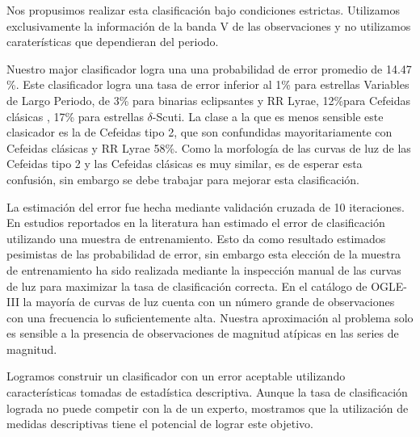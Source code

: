 \documentclass[letterpaper,12pt]{book}
\begin{document}
Nos propusimos realizar esta clasificación bajo condiciones estrictas. Utilizamos exclusivamente la información de la banda V de las observaciones y no utilizamos caraterísticas que dependieran del periodo.  

Nuestro major clasificador logra una una probabilidad de error promedio de 14.47 \%. Este clasificador logra una tasa de error inferior al 1\% para estrellas Variables de Largo Periodo, de 3\% para  binarias eclipsantes y RR Lyrae, 12\%para Cefeidas clásicas , 17\% para estrellas $\delta$-Scuti. La clase a la que es menos sensible este clasicador es la de Cefeidas tipo 2, que son confundidas mayoritariamente con Cefeidas clásicas y RR Lyrae 58\%. Como la morfología de las curvas de luz de las Cefeidas tipo 2 y las Cefeidas clásicas es muy similar, es de esperar esta confusión, sin embargo se debe trabajar para mejorar esta clasificación. 

La estimación del error fue hecha mediante validación cruzada de 10 iteraciones. En estudios reportados en la literatura han estimado el error de clasificación utilizando una muestra de entrenamiento. Esto da como resultado estimados pesimistas de las probabilidad de error, sin embargo esta elección de la muestra de entrenamiento ha sido realizada mediante la inspección manual de las curvas de luz para maximizar la tasa de clasificación correcta. En el catálogo de OGLE-III la mayoría de curvas de luz cuenta con un número grande de observaciones con una frecuencia lo suficientemente alta. Nuestra aproximación al problema solo es sensible a la presencia de observaciones de magnitud atípicas en las series de magnitud. 

Logramos construir un clasificador con un error aceptable utilizando características tomadas de estadística descriptiva. Aunque la tasa de clasificación lograda no puede competir con la de un experto, mostramos que la utilización de medidas descriptivas tiene el potencial de lograr este objetivo.    
\end{document}
